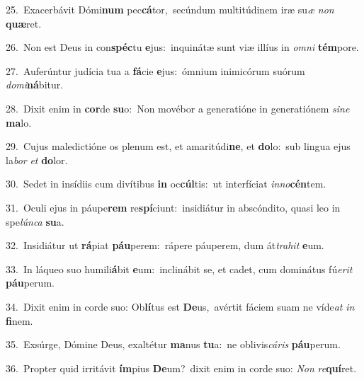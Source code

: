 {\numbfont\textcolor{\numbcolor}{25.}}~Exacerbávit Dómi\textbf{num} pec\-\textbf{cá}\-tor,~\star secúndum multitúdinem iræ su\textit{æ} \textit{non} \textbf{quæ}\-ret.\par
{\numbfont\textcolor{\numbcolor}{26.}}~Non est Deus in con\-\textbf{spéc}\-tu \textbf{e}\-jus:~\star inquinátæ sunt viæ illíus in \textit{om}\-\textit{ni} \textbf{tém}\-pore.\par
{\numbfont\textcolor{\numbcolor}{27.}}~Auferúntur judícia tua a \textbf{fá}\-cie \textbf{e}\-jus:~\star ómnium inimicórum suórum \textit{do}\-\textit{mi}\textbf{ná}bitur.\par
{\numbfont\textcolor{\numbcolor}{28.}}~Dixit enim in \textbf{cor}\-de \textbf{su}\-o:~\star Non movébor a generatióne in generatiónem \textit{si}\-\textit{ne} \textbf{ma}\-lo.\par
{\numbfont\textcolor{\numbcolor}{29.}}~Cujus maledictióne os plenum est, et amaritúdi\-\textbf{ne}\-, et \textbf{do}\-lo:~\star sub lingua ejus la\textit{bor} \textit{et} \textbf{do}\-lor.\par
{\numbfont\textcolor{\numbcolor}{30.}}~Sedet in insídiis cum divítibus \textbf{in} oc\-\textbf{cúl}\-tis:~\star ut interfíciat \textit{in}\-\textit{no}\textbf{cén}tem.\par
{\numbfont\textcolor{\numbcolor}{31.}}~Oculi ejus in páupe\textbf{rem} re\-\textbf{spí}\-ciunt:~\star insidiátur in abscóndito, quasi leo in spe\-\textit{lún}\-\textit{ca} \textbf{su}\-a.\par
{\numbfont\textcolor{\numbcolor}{32.}}~Insidiátur ut \textbf{rá}\-piat \textbf{páu}\-perem:~\star rápere páuperem, dum át\-\textit{tra}\-\textit{hit} \textbf{e}\-um.\par
{\numbfont\textcolor{\numbcolor}{33.}}~In láqueo suo humili\-\textbf{á}\-bit \textbf{e}\-um:~\star inclinábit se, et cadet, cum dominátus fú\-\textit{e}\-\textit{rit} \textbf{páu}\-perum.\par
{\numbfont\textcolor{\numbcolor}{34.}}~Dixit enim in corde suo: Ob\-\textbf{lí}\-tus est \textbf{De}\-us,~\star avértit fáciem suam ne víde\textit{at} \textit{in} \textbf{fi}\-nem.\par
{\numbfont\textcolor{\numbcolor}{35.}}~Exsúrge, Dómine Deus, exaltétur \textbf{ma}\-nus \textbf{tu}\-a:~\star ne oblivis\-\textit{cá}\-\textit{ris} \textbf{páu}\-perum.\par
{\numbfont\textcolor{\numbcolor}{36.}}~Propter quid irritávit \textbf{ím}\-pius \textbf{De}\-um?~\star dixit enim in corde suo: \textit{Non} \textit{re}\-\textbf{quí}ret.\par
